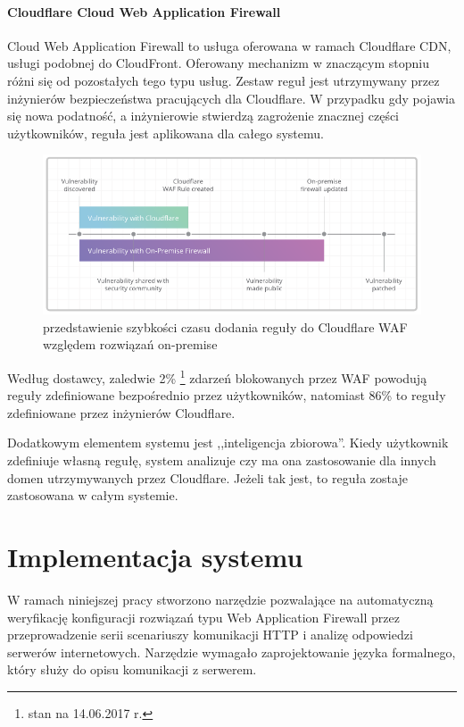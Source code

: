 \documentclass[11pt,a4paper,polish,thesis]{dcsbook}
\begin{document}
\subsubsection{Cloudflare Cloud Web Application Firewall}
Cloud Web Application Firewall to usługa oferowana w ramach Cloudflare CDN, usługi podobnej do CloudFront. Oferowany mechanizm w znaczącym stopniu różni się od pozostałych tego typu usług. Zestaw reguł jest utrzymywany przez inżynierów bezpieczeństwa pracujących dla Cloudflare. W przypadku gdy pojawia się nowa podatność, a inżynierowie stwierdzą zagrożenie znacznej części użytkowników, reguła jest aplikowana dla całego systemu.

\begin{figure}[h]
\centering
\includegraphics[scale=0.7]{cloudflare}

\caption{przedstawienie szybkości czasu dodania reguły do Cloudflare WAF względem rozwiązań on-premise \cite{cloudflarewaf}}
\label{fig:cloudflare}
\end{figure}

Według dostawcy, zaledwie 2\% \footnote{stan na 14.06.2017 r.} zdarzeń blokowanych przez WAF powodują reguły zdefiniowane bezpośrednio przez użytkowników, natomiast 86\% to reguły zdefiniowane przez inżynierów Cloudflare.

Dodatkowym elementem systemu jest ,,inteligencja zbiorowa''. Kiedy użytkownik zdefiniuje własną regułę, system analizuje czy ma ona zastosowanie dla innych domen utrzymywanych przez Cloudflare. Jeżeli tak jest, to reguła zostaje zastosowana w całym systemie.



\chapter{Implementacja systemu}
W ramach niniejszej pracy stworzono narzędzie pozwalające na automatyczną weryfikację konfiguracji rozwiązań typu Web Application Firewall przez przeprowadzenie serii scenariuszy komunikacji HTTP i analizę odpowiedzi serwerów internetowych. Narzędzie wymagało zaprojektowanie języka formalnego, który służy do opisu komunikacji z serwerem. 
\end{document}
